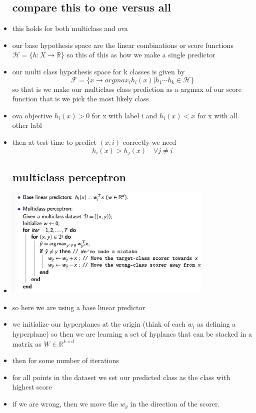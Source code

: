 \documentclass{article}
\begin{document}
\begin{itemize}
\subsection*{compare this to one versus all}
\item this holds for both multiclass and ova
\item our base hypothesis space are the linear combinations or score functions $\mathcal{H}=\{h:X\rightarrow \mathbb{R}\}$ so this of this as how we make a single predictor
\item our multi class hypothesis space for k classes is given by $$\mathcal{F}=\{ x\rightarrow argmax_{i}h_{i}(x)|h_1\cdots h_{k}\in \mathcal{H}\}$$ so that is we make our multiclass class prediction as a argmax of our score function that is we pick the most likely class 
\item  ova objective $h_{i}(x)>0$ for x with label i and $h_{i}(x)<x$ for x with all other labl 
\item then at test time to predict $(x,i)$ correctly we need $$h_{i}(x)>h_{j}(x)\quad \forall j\neq i$$
\subsection*{multiclass perceptron }
\item \includegraphics*[width=10cm]{images/Screenshot 2023-05-14 at 3.54.19 PM.png}
\item so here we are using a base linear predictor
\item we initialize our hyperplanes at the origin  (think of each $w_i$ as defining a hyperplane) so then we are learning a set of hyplanes that can be stacked in a matrix as $W\in \mathbb{R}^{k\times d}$
\item then for some number of iterations 
\item for all points in the dataset we set our predicted class as the class with highest score 
\item if we are wrong, then we move the $w_y$ in the direction of the scorer. 

\end{itemize}
\end{document}
